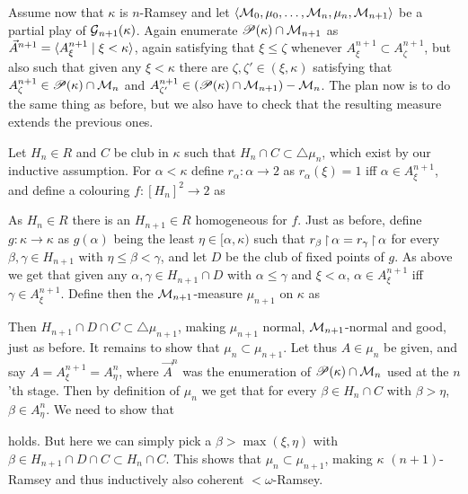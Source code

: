 \documentclass[../main]{subfiles}
\begin{document}
{	\qquad Assume now that $\kappa$ is $n$-Ramsey and let $\langle \operatorname{\mathcal M}_0,\mu_0,\hdots,\operatorname{\mathcal M}_n,\mu_n,\operatorname{\mathcal M}_{n+1}\rangle$ be a partial play of $\operatorname{\mathcal G}_{n+1}(\kappa)$. Again enumerate $\mathscr P(\kappa)\cap\operatorname{\mathcal M}_{n+1}$ as $\vec A^{n+1}=\langle A^{n+1}_\xi\mid\xi<\kappa\rangle$, again satisfying that $\xi\leq\zeta$ whenever $A^{n+1}_\xi\subset A^{n+1}_\zeta$, but also such that given any $\xi<\kappa$ there are $\zeta,\zeta'\in(\xi,\kappa)$ satisfying that $A^{n+1}_\zeta\in\mathscr P(\kappa)\cap\operatorname{\mathcal M}_n$ and $A^{n+1}_{\zeta'}\in(\mathscr P(\kappa)\cap\operatorname{\mathcal M}_{n+1})-\operatorname{\mathcal M}_n$. The plan now is to do the same thing as before, but we also have to check that the resulting measure extends the previous ones.

	\qquad Let $H_n\in R$ and $C$ be club in $\kappa$ such that $H_n\cap C\subset\triangle\mu_n$, which exist by our inductive assumption. For $\alpha<\kappa$ define $r_\alpha:\alpha\to 2$ as $r_\alpha(\xi)=1$ iff $\alpha\in A^{n+1}_\xi$, and define a colouring $f:[H_n]^2\to 2$ as

	As $H_n\in R$ there is an $H_{n+1}\in R$ homogeneous for $f$. Just as before, define $g:\kappa\to\kappa$ as $g(\alpha)$ being the least $\eta\in[\alpha,\kappa)$ such that $r_\beta\operatorname{\upharpoonright}\alpha=r_\gamma\operatorname{\upharpoonright}\alpha$ for every $\beta,\gamma\in H_{n+1}$ with $\eta\leq\beta<\gamma$, and let $D$ be the club of fixed points of $g$. As above we get that given any $\alpha,\gamma\in H_{n+1}\cap D$ with $\alpha\leq\gamma$ and $\xi<\alpha$, $\alpha\in A^{n+1}_\xi$ iff $\gamma\in A^{n+1}_\xi$. Define then the $\operatorname{\mathcal M}_{n+1}$-measure $\mu_{n+1}$ on $\kappa$ as

	Then $H_{n+1}\cap D\cap C\subset\triangle\mu_{n+1}$, making $\mu_{n+1}$ normal, $\operatorname{\mathcal M}_{n+1}$-normal and good, just as before. It remains to show that $\mu_n\subset\mu_{n+1}$. Let thus $A\in\mu_n$ be given, and say $A=A^{n+1}_\xi=A^n_\eta$, where $\vec A^n$ was the enumeration of $\mathscr P(\kappa)\cap\operatorname{\mathcal M}_n$ used at the $n$'th stage. Then by definition of $\mu_n$ we get that for every $\beta\in H_n\cap C$ with $\beta>\eta$, $\beta\in A^n_\eta$. We need to show that

	holds. But here we can simply pick a $\beta>\max(\xi,\eta)$ with $\beta\in H_{n+1}\cap D\cap C\subset H_n\cap C$. This shows that $\mu_n\subset\mu_{n+1}$, making $\kappa$ $(n{+}1)$-Ramsey and thus inductively also coherent ${<}\omega$-Ramsey.
}
\end{document}

